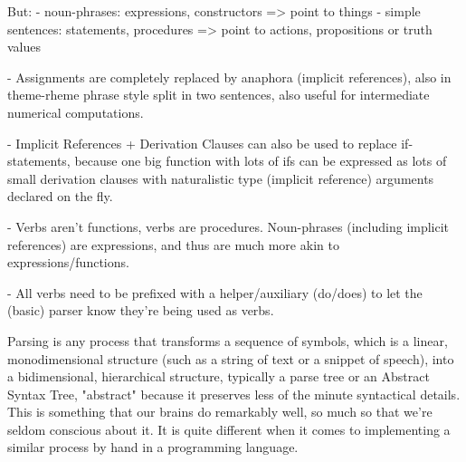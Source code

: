 
But:
- noun-phrases: expressions, constructors => point to things
- simple sentences: statements, procedures => point to actions, propositions or truth values

- Assignments are completely replaced by anaphora (implicit references), also in
  theme-rheme phrase style split in two sentences, also useful for intermediate
  numerical computations.

- Implicit References + Derivation Clauses can also be used to replace
  if-statements, because one big function with lots of ifs can be expressed as
  lots of small derivation clauses with naturalistic type (implicit reference)
  arguments declared on the fly.


- Verbs aren't functions, verbs are procedures. Noun-phrases (including implicit
  references) are expressions, and thus are much more akin to expressions/functions.

- All verbs need to be prefixed with a helper/auxiliary (do/does) to let the (basic) parser know they're being used as verbs.


Parsing is any process that transforms a sequence of symbols, which is a linear, monodimensional structure (such as a string of text or a snippet of speech), into a bidimensional, hierarchical structure, typically a parse tree or an Abstract Syntax Tree, "abstract" because it preserves less of the minute syntactical details. This is something that our brains do remarkably well, so much so that we're seldom conscious about it. It is quite different when it comes to implementing a similar process by hand in a programming language.










